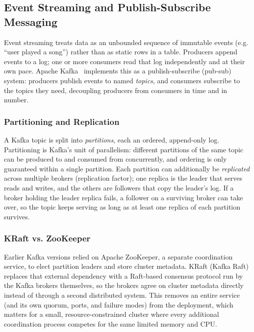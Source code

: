 \subsection{Event Streaming and Publish-Subscribe Messaging}

Event streaming treats data as an unbounded sequence of immutable events (e.g. ``user played a song'') rather than as static rows in a table. Producers append events to a log; one or more consumers read that log independently and at their own pace. Apache Kafka~\cite{kafka} implements this as a publish-subscribe (pub-sub) system: producers publish events to named \emph{topics}, and consumers subscribe to the topics they need, decoupling producers from consumers in time and in number.

\subsubsection{Partitioning and Replication}

A Kafka topic is split into \emph{partitions}, each an ordered, append-only log. Partitioning is Kafka's unit of parallelism: different partitions of the same topic can be produced to and consumed from concurrently, and ordering is only guaranteed within a single partition. Each partition can additionally be \emph{replicated} across multiple brokers (replication factor); one replica is the leader that serves reads and writes, and the others are followers that copy the leader's log. If a broker holding the leader replica fails, a follower on a surviving broker can take over, so the topic keeps serving as long as at least one replica of each partition survives.

\subsubsection{KRaft vs. ZooKeeper}

Earlier Kafka versions relied on Apache ZooKeeper, a separate coordination service, to elect partition leaders and store cluster metadata. KRaft (Kafka Raft) replaces that external dependency with a Raft-based consensus protocol run by the Kafka brokers themselves, so the brokers agree on cluster metadata directly instead of through a second distributed system. This removes an entire service (and its own quorum, ports, and failure modes) from the deployment, which matters for a small, resource-constrained cluster where every additional coordination process competes for the same limited memory and CPU.

